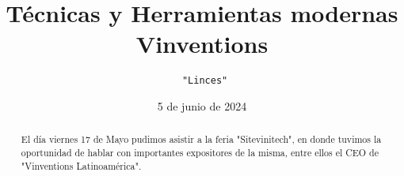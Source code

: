 \documentclass[letterpaper,12pt]{article} %
\newcommand{\myMateria}{Técnicas y Herramientas modernas}
\newcommand{\myGrupo}{ "Linces"}
\newcommand{\MyReport}{Vinventions}
\newcommand{\myDate}{5 de junio de 2024}
\begin{document}
    
    \newpage
    \tableofcontents
    \newpage

\title{\myMateria \\\textbf{\MyReport} \\ } 

\author{ \normalsize{\texttt{\myGrupo}} }
\date{\myDate}
\maketitle
\thispagestyle{fancy}

\begin{abstract}
El día viernes 17 de Mayo pudimos asistir a la feria "Sitevinitech", en donde tuvimos la oportunidad de hablar con importantes expositores de la misma, entre ellos el CEO de "Vinventions Latinoamérica". 
\end{abstract}









\centering\vspace*{\fill} 
\end{document}
